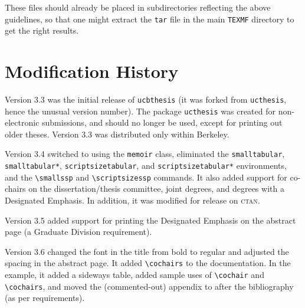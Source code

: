 \documentclass[11pt]{article}
\newcommand*{\pkg}[1]{\texttt{#1}}
\begin{document}
These files should already be placed in subdirectories reflecting the above
guidelines, so that one might extract the \texttt{tar} file in the main
\lstinline!TEXMF! directory to get the right results.

\section{Modification History}

Version 3.3 was the initial release of \pkg{ucbthesis} (it was forked from
\pkg{ucthesis}, hence the unusual version number).  The package \pkg{ucthesis}
was created for non-electronic submissions, and should no longer be used,
except for printing out older theses.  Version 3.3 was distributed only within
Berkeley.

Version 3.4 switched to using the \pkg{memoir} class, eliminated the
\texttt{smalltabular}, \texttt{smalltabular*}, \texttt{scriptsizetabular},
and\break
\texttt{scriptsizetabular*} environments, and the \lstinline!\smallssp!
and\break
\lstinline!\scriptsizessp! commands.  It also added support for co-chairs
on the dissertation/thesis committee, joint degrees, and degrees with a
Designated Emphasis.  In addition, it was modified for release on \textsc{ctan}.

Version 3.5 added support for printing the Designated Emphasis on the abstract
page (a Graduate Division requirement).

Version 3.6 changed the font in the title from bold to regular and adjusted the
spacing in the abstract page.  It added \lstinline!\cochairs! to the
documentation.  In the example, it added a sideways table, added sample uses
of \lstinline!\cochair! and \lstinline!\cochairs!, and moved the (commented-out)
appendix to after the bibliography (as per requirements).
\end{document}

